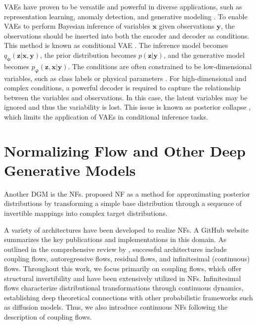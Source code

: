 \acp{VAE} have proven to be versatile and powerful in diverse applications, such as representation learning, anomaly detection, and generative modeling \citep{Mienye2025}. To enable \acp{VAE} to perform Bayesian inference of variables $\boldsymbol{x}$ given observations $\boldsymbol{y}$, the observations should be inserted into both the encoder and decoder as conditions. This method is known as conditional \ac{VAE} \citep{sohn2015cvae}. The inference model becomes $q_{\boldsymbol{\phi}}(\boldsymbol{z}|\boldsymbol{x}, \boldsymbol{y})$, the prior distribution becomes $p(\boldsymbol{z}|\boldsymbol{y})$, and the generative model becomes $p_{\boldsymbol{\varphi}}(\boldsymbol{z}, \boldsymbol{x}|\boldsymbol{y})$. The conditions are often constrained to be low-dimensional variables, such as class labels \citep{sohn2015cvae} or physical parameters \citep{martínezpalomera2020pelsvae}. For high-dimensional and complex conditions, a powerful decoder is required to capture the relationship between the variables and observations. In this case, the latent variables may be ignored and thus the variability is lost. This issue is known as posterior collapse \citep{bowman2016cvae, mccarthy2020cvae}, which limits the application of \acp{VAE} in conditional inference tasks.

\section{Normalizing Flow and Other Deep Generative Models}
Another \ac{DGM} is the \acfp{NF}. \citeauthor{rezende2016} \citeyearpar{rezende2016} proposed \ac{NF} as a method for approximating posterior distributions by transforming a simple base distribution through a sequence of invertible mappings into complex target distributions. 

A variety of architectures have been developed to realize \acp{NF}. A GitHub website \citep{awesomenfs} summarizes the key publications and implementations in this domain. As outlined in the comprehensive review by \citet{kobyzev2021nfsreview}, successful architectures include coupling flows, autoregressive flows, residual flows, and infinitesimal (continuous) flows. Throughout this work, we focus primarily on coupling flows, which offer structural invertibility and have been extensively utilized in \acp{NF}. Infinitesimal flows characterize distributional transformations through continuous dynamics, establishing deep theoretical connections with other probabilistic frameworks such as diffusion models. Thus, we also introduce continuous \acp{NF} following the description of coupling flows.

